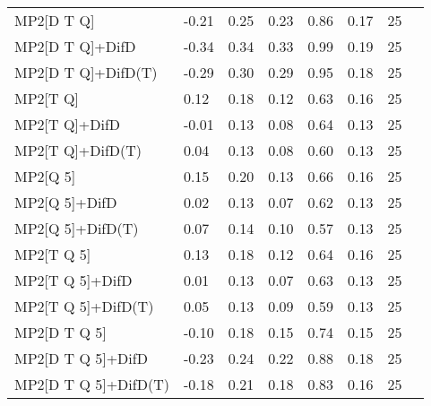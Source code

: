 \begin{table}
\begin{tabular}{l l l l l l l l }
    MP2[D T Q] & -0.21 & 0.25 & 0.23 & 0.86 & 0.17 & 25 \\ 
    MP2[D T Q]+DifD & -0.34 & 0.34 & 0.33 & 0.99 & 0.19 & 25 \\ 
    MP2[D T Q]+DifD(T) & -0.29 & 0.30 & 0.29 & 0.95 & 0.18 & 25 \\ 
    MP2[T Q] & 0.12 & 0.18 & 0.12 & 0.63 & 0.16 & 25 \\ 
    MP2[T Q]+DifD & -0.01 & 0.13 & 0.08 & 0.64 & 0.13 & 25 \\ 
    MP2[T Q]+DifD(T) & 0.04 & 0.13 & 0.08 & 0.60 & 0.13 & 25 \\ 
    MP2[Q 5] & 0.15 & 0.20 & 0.13 & 0.66 & 0.16 & 25 \\ 
    MP2[Q 5]+DifD & 0.02 & 0.13 & 0.07 & 0.62 & 0.13 & 25 \\ 
    MP2[Q 5]+DifD(T) & 0.07 & 0.14 & 0.10 & 0.57 & 0.13 & 25 \\ 
    MP2[T Q 5] & 0.13 & 0.18 & 0.12 & 0.64 & 0.16 & 25 \\ 
    MP2[T Q 5]+DifD & 0.01 & 0.13 & 0.07 & 0.63 & 0.13 & 25 \\ 
    MP2[T Q 5]+DifD(T) & 0.05 & 0.13 & 0.09 & 0.59 & 0.13 & 25 \\ 
    MP2[D T Q 5] & -0.10 & 0.18 & 0.15 & 0.74 & 0.15 & 25 \\ 
    MP2[D T Q 5]+DifD & -0.23 & 0.24 & 0.22 & 0.88 & 0.18 & 25 \\ 
    MP2[D T Q 5]+DifD(T) & -0.18 & 0.21 & 0.18 & 0.83 & 0.16 & 25 \\ 
    \bottomrule
  \end{tabular}
\end{table}
